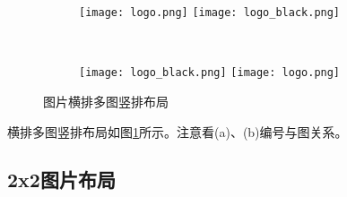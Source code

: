 \begin{figure}[!htb]
    \centering
    \begin{subfigure}[t]{0.3\linewidth}
        \captionsetup{justification=centering} 
        \begin{minipage}[b]{1\linewidth}
        \texttt{[image: logo.png]}
        \texttt{[image: logo\_black.png]}
        \caption{}
        \end{minipage}
    \end{subfigure}\\
    \begin{subfigure}[t]{0.3\linewidth}
        \captionsetup{justification=centering} 
        \begin{minipage}[b]{1\linewidth}
        \texttt{[image: logo\_black.png]}
        \texttt{[image: logo.png]}
        \caption{}
        \end{minipage}
    \end{subfigure}
    \caption{图片横排多图竖排布局}
    \label{f.csu_row_col}
\end{figure}

横排多图竖排布局如图\ref{f.csu_row_col}所示。注意看(a)、(b)编号与图关系。

\subsection{2x2图片布局}

